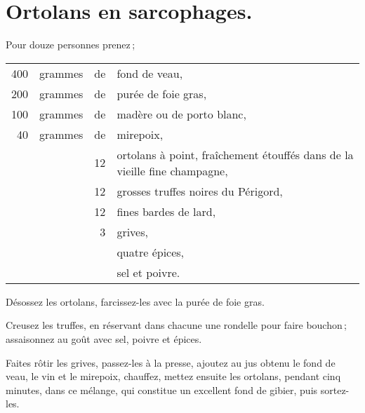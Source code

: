 \section*{\centering Ortolans en sarcophages.}
{}

Pour douze personnes prenez ;

\medskip

\footnotesize
\begin{longtable}{rrrp{16em}}
    400 & grammes & de & fond de veau,                                                                    \\
    200 & grammes & de & purée de foie gras,                                                              \\
    100 & grammes & de & madère ou de porto blanc,                                                        \\
     40 & grammes & de & mirepoix,                                                                        \\
        &         & 12 & ortolans à point, fraîchement étouffés dans de la vieille fine champagne,        \\
        &         & 12 & grosses truffes noires du Périgord,                                              \\
        &         & 12 & fines bardes de lard,                                                            \\
        &         &  3 & grives,                                                                          \\
        &         &    & quatre épices,                                                                   \\
        &         &    & sel et poivre.                                                                   \\
\end{longtable}
\normalsize

Désossez les ortolans, farcissez-les avec la purée de foie gras.

Creusez les truffes, en réservant dans chacune une rondelle pour faire bouchon ;
assaisonnez au goût avec sel, poivre et épices.

Faites rôtir les grives, passez-les à la presse, ajoutez au jus obtenu le fond
de veau, le vin et le mirepoix, chauffez, mettez ensuite les ortolans, pendant
cinq minutes, dans ce mélange, qui constitue un excellent fond de gibier, puis
sortez-les.

